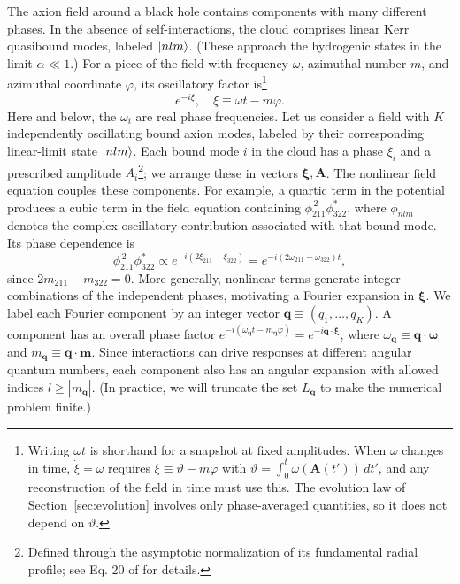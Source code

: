 \documentclass[11pt]{article}
\newcommand{\ON}[1]{ \textcolor{violet}{(ON: #1)} }
\begin{document}

The axion field around a black hole contains components with many different phases. In the absence of self-interactions, the cloud comprises linear Kerr quasibound modes, labeled $\ket{nlm}$. (These approach the hydrogenic states in the limit $\alpha\ll1$.) For a piece of the field with frequency $\omega$, azimuthal number $m$, and azimuthal coordinate $\varphi$, its oscillatory factor is\footnote{Writing $\omega t$ is shorthand for a snapshot at fixed amplitudes. When $\omega$ changes in time, $\dot\xi=\omega$ requires $\xi \equiv \vartheta - m\varphi$ with $\vartheta = \int_0^t \omega(\mathbf{A}(t'))\,dt'$, and any reconstruction of the field in time must use this. The evolution law of Section~\ref{sec:evolution} involves only phase-averaged quantities, so it does not depend on $\vartheta$.}
\begin{equation}
    e^{-i\xi}, \quad \xi \equiv \omega t - m \varphi.
\end{equation}
Here and below, the $\omega_i$ are real phase frequencies. Let us consider a field with $K$ independently oscillating bound axion modes, labeled by their corresponding linear-limit state $\ket{nlm}$. Each bound mode $i$ in the cloud has a phase $\xi_i$ and a prescribed amplitude $A_i$\footnote{Defined through the asymptotic normalization of its fundamental radial profile; see Eq. 20 of \cite{Omiya_2022} for details.}; we arrange these in vectors $\boldsymbol{\xi}, \mathbf{A}$. The nonlinear field equation couples these components. For example, a quartic term in the potential produces a cubic term in the field equation containing $\phi_{211}^{\,2}\phi_{322}^{*}$, where $\phi_{nlm}$ denotes the complex oscillatory contribution associated with that bound mode. Its phase dependence is
\begin{equation}
    \phi_{211}^{\,2}\phi_{322}^{*}
    \propto e^{-i(2\xi_{211}-\xi_{322})}
    = e^{-i(2\omega_{211}-\omega_{322})t},
\end{equation}
since $2m_{211}-m_{322}=0$.
More generally, nonlinear terms generate integer combinations of the independent phases, motivating a Fourier expansion in $\boldsymbol{\xi}$. We label each Fourier component by an integer vector $\mathbf{q} \equiv (q_1,\ldots,q_K)$. A component has an overall phase factor $e^{-i(\omega_\mathbf{q} t - m_\mathbf{q} \varphi)} = e^{-i\mathbf{q}\cdot\boldsymbol{\xi}}$, where $\omega_\mathbf{q} \equiv \mathbf{q} \cdot \boldsymbol{\omega}$ and $m_\mathbf{q} \equiv \mathbf{q} \cdot \mathbf{m}$. Since interactions can drive responses at different angular quantum numbers, each component also has an angular expansion with allowed indices $l \geq |m_\mathbf{q}|$. (In practice, we will truncate the set $L_\mathbf{q}$ to make the numerical problem finite.)
\end{document}
